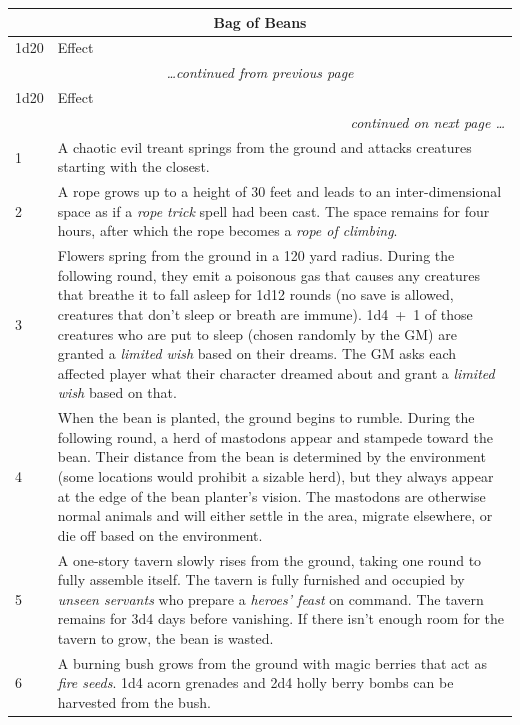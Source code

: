 \noindent \begin{longtable}{|p{}|p{}|}
\multicolumn{2}{c}{Bag of Beans} \\
\hline
1d20	& Effect \\
\hline\hline
\endfirsthead
\multicolumn{2}{c}{\textit{\ldots continued from previous page}} \\
\hline
1d20	& Effect \\
\hline\hline
\endhead
\hline
\multicolumn{2}{r}{\textit{continued on next page \ldots}}\\
\endfoot
\hline
\endlastfoot
\rowcolor[gray]{0.9}1	& A chaotic evil treant springs from the ground and attacks creatures starting with the closest. \\
2	& A rope grows up to a height of 30 feet and leads to an inter-dimensional space as if a \textit{rope trick} spell had been cast.  The space remains for four hours, after which the rope becomes a \textit{rope of climbing}. \\
\rowcolor[gray]{0.9}3	& Flowers spring from the ground in a 120 yard radius.  During the following round, they emit a poisonous gas that causes any creatures that breathe it to fall asleep for 1d12 rounds (no save is allowed, creatures that don't sleep or breath are immune).  1d4~+~1 of those creatures who are put to sleep (chosen randomly by the GM) are granted a \textit{limited wish} based on their dreams.  The GM asks each affected player what their character dreamed about and grant a \textit{limited wish} based on that. \\
4	& When the bean is planted, the ground begins to rumble.  During the following round, a herd of mastodons appear and stampede toward the bean.  Their distance from the bean is determined by the environment (some locations would prohibit a sizable herd), but they always appear at the edge of the bean planter's vision.  The mastodons are otherwise normal animals and will either settle in the area, migrate elsewhere, or die off based on the environment. \\
\rowcolor[gray]{0.9}5	& A one-story tavern slowly rises from the ground, taking one round to fully assemble itself.  The tavern is fully furnished and occupied by \textit{unseen servants} who prepare a \textit{heroes' feast} on command.  The tavern remains for 3d4 days before vanishing.  If there isn't enough room for the tavern to grow, the bean is wasted. \\
6	& A burning bush grows from the ground with magic berries that act as \textit{fire seeds}.  1d4 acorn grenades and 2d4 holly berry bombs can be harvested from the bush. \\

\end{longtable}
